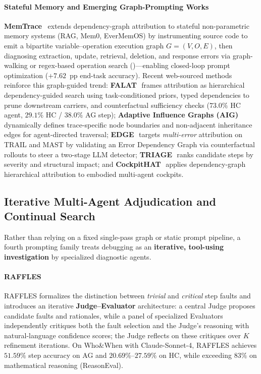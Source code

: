 \paragraph{Stateful Memory and Emerging Graph-Prompting Works}
\textbf{MemTrace}~\citep{deng2026memtrace} extends dependency-graph attribution to stateful non-parametric memory systems (RAG, Mem0, EverMemOS) by instrumenting source code to emit a bipartite variable--operation execution graph $G=(V,O,E)$, then diagnosing extraction, update, retrieval, deletion, and response errors via graph-walking or regex-based operation search ()---enabling closed-loop prompt optimization ($+7.62$~pp end-task accuracy).
Recent web-sourced methods reinforce this graph-guided trend:
\textbf{FALAT}~\citep{rafi2026falat}\,\webtag frames attribution as hierarchical dependency-guided search using task-conditioned priors, typed dependencies to prune downstream carriers, and counterfactual sufficiency checks ($73.0\%$ HC agent, $29.1\%$ HC / $38.0\%$ AG step);
\textbf{Adaptive Influence Graphs (AIG)}~\citep{bakish2026aig}\,\webtag dynamically defines trace-specific node boundaries and non-adjacent inheritance edges for agent-directed traversal;
\textbf{EDGE}~\citep{hou2026edge}\,\webtag targets \emph{multi-error} attribution on TRAIL and MAST by validating an Error Dependency Graph via counterfactual rollouts to steer a two-stage LLM detector;
\textbf{TRIAGE}~\citep{wang2026triage}\,\webtag ranks candidate steps by severity and structural impact; and
\textbf{CockpitHAT}~\citep{wang2026cockpithat}\,\webtag applies dependency-graph hierarchical attribution to embodied multi-agent cockpits.

\subsection{Iterative Multi-Agent Adjudication and Continual Search}
Rather than relying on a fixed single-pass graph or static prompt pipeline, a fourth prompting family treats debugging as an \textbf{iterative, tool-using investigation} by specialized diagnostic agents.

\paragraph{RAFFLES~\citep{zhu2026raffles}}
RAFFLES formalizes the distinction between \emph{trivial} and \emph{critical} step faults and introduces an iterative \textbf{Judge--Evaluator} architecture: a central Judge proposes candidate faults and rationales, while a panel of specialized Evaluators independently critiques both the fault selection and the Judge's reasoning with natural-language confidence scores; the Judge reflects on these critiques over $K$ refinement iterations. On Who\&When with Claude-Sonnet-4, RAFFLES achieves $51.59\%$ step accuracy on AG and $20.69\%$--$27.59\%$ on HC, while exceeding $83\%$ on mathematical reasoning (ReasonEval).

